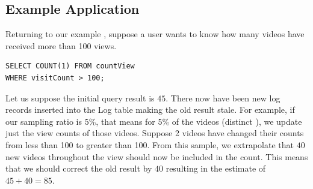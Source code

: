 \subsection{Example Application}
Returning to our example , suppose a user wants to know how many videos have received more than 100 views.
\begin{lstlisting}[basicstyle={\scriptsize}]
SELECT COUNT(1) FROM countView 
WHERE visitCount > 100;
\end{lstlisting}
Let us suppose the initial query result is $45$.
There now have been new log records inserted into the Log table making the old result stale.
For example, if our sampling ratio is 5\%, that means for 5\% of the videos (distinct ), we update just the view counts of those videos.
Suppose 2 videos have changed their counts from less than 100 to greater than 100.
From this sample, we extrapolate that $40$ new videos throughout the view should now be included in the count.
This means that we should correct the old result by $40$ resulting in the estimate of $45+40 = 85$.
